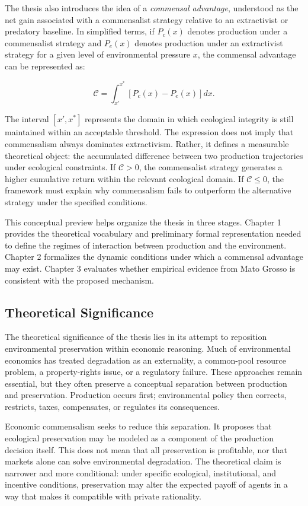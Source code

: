 The thesis also introduces the idea of a \emph{commensal advantage}, understood as the net gain associated with a commensalist strategy relative to an extractivist or predatory baseline. In simplified terms, if \(P_c(x)\) denotes production under a commensalist strategy and \(P_e(x)\) denotes production under an extractivist strategy for a given level of environmental pressure \(x\), the commensal advantage can be represented as:

\[
\mathcal{C} =
\int_{x'}^{x^*} \left[ P_c(x) - P_e(x) \right] dx.
\]

The interval \([x',x^*]\) represents the domain in which ecological integrity is still maintained within an acceptable threshold. The expression does not imply that commensalism always dominates extractivism. Rather, it defines a measurable theoretical object: the accumulated difference between two production trajectories under ecological constraints. If \(\mathcal{C} > 0\), the commensalist strategy generates a higher cumulative return within the relevant ecological domain. If \(\mathcal{C} \leq 0\), the framework must explain why commensalism fails to outperform the alternative strategy under the specified conditions.

This conceptual preview helps organize the thesis in three stages. Chapter 1 provides the theoretical vocabulary and preliminary formal representation needed to define the regimes of interaction between production and the environment. Chapter 2 formalizes the dynamic conditions under which a commensal advantage may exist. Chapter 3 evaluates whether empirical evidence from Mato Grosso is consistent with the proposed mechanism.

\subsection{Theoretical Significance}

The theoretical significance of the thesis lies in its attempt to reposition environmental preservation within economic reasoning. Much of environmental economics has treated degradation as an externality, a common-pool resource problem, a property-rights issue, or a regulatory failure. These approaches remain essential, but they often preserve a conceptual separation between production and preservation. Production occurs first; environmental policy then corrects, restricts, taxes, compensates, or regulates its consequences.

Economic commensalism seeks to reduce this separation. It proposes that ecological preservation may be modeled as a component of the production decision itself. This does not mean that all preservation is profitable, nor that markets alone can solve environmental degradation. The theoretical claim is narrower and more conditional: under specific ecological, institutional, and incentive conditions, preservation may alter the expected payoff of agents in a way that makes it compatible with private rationality.

